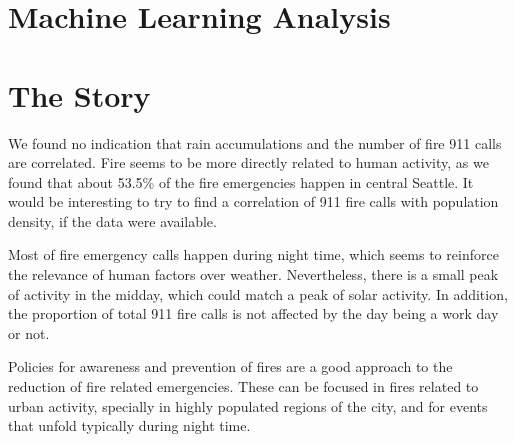 \documentclass[12pt,a4paper]{article}
\begin{document}
\section{Machine Learning Analysis}

\cite{Tibshirani}


\section{The Story}

We found no indication that rain accumulations and the number of fire 911 calls are correlated. Fire seems to be more directly related to human activity, as we found that about 53.5\% of the fire emergencies happen in central Seattle. It would be interesting to try to find a correlation of 911 fire calls with population density, if the data were available.

Most of fire emergency calls happen during night time, which seems to reinforce the relevance of human factors over weather. Nevertheless, there is a small peak of activity in the midday, which could match a peak of solar activity. In addition, the proportion of total 911 fire calls is not affected by the day being a work day or not.

Policies for awareness and prevention of fires are a good approach to the reduction of fire related emergencies. These can be focused in fires related to urban activity, specially in highly populated regions of the city, and for events that unfold typically during night time.






%

\end{document}
